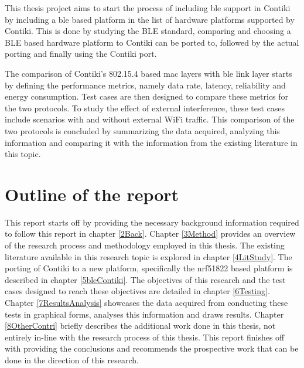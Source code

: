 This thesis project aims to start the process of including \gls{ble} support in Contiki by including a \gls{ble} based platform in the list of hardware platforms supported by Contiki. This is done by studying the BLE standard, comparing and choosing a BLE based hardware platform to Contiki can be ported to, followed by the actual porting and finally using the Contiki port. 

The comparison of Contiki's 802.15.4 based \gls{mac} layers with \gls{ble} link layer starts by defining the performance metrics, namely data rate, latency, reliability and energy consumption. Test cases are then designed to compare these metrics for the two protocols. To study the effect of external interference, these test cases include scenarios with and without external WiFi traffic. This comparison of the two protocols is concluded by summarizing the data acquired, analyzing this information and comparing it with the information from the existing literature in this topic.



\section{Outline of the report}

This report starts off by providing the necessary background information required to follow this report in chapter \ref{2Back}. Chapter \ref{3Method} provides an overview of the research process and methodology employed in this thesis. The existing literature available in this research topic is explored in chapter \ref{4LitStudy}. The porting of Contiki to a new platform, specifically the nrf51822 based platform is described in chapter \ref{5bleContiki}. The objectives of this research and the test cases designed to reach these objectives are detailed in chapter \ref{6Testing}. Chapter \ref{7ResultsAnalysis} showcases the data acquired from conducting these tests in graphical forms, analyses this information and draws results. Chapter \ref{8OtherContri} briefly describes the additional work done in this thesis, not entirely in-line with the research process of this thesis. This report finishes off with providing the conclusions and recommends the prospective work that can be done in the direction of this research.

